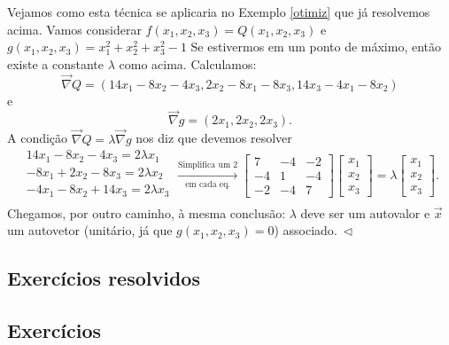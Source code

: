 \begin{obs}[Opcional]
	Vejamos como esta técnica se aplicaria no Exemplo \ref{otimiz} que já resolvemos acima. Vamos considerar $f(x_1,x_2,x_3) = Q(x_1,x_2,x_3)$ e $g(x_1,x_2,x_3) = x_1^2 + x_2^2 + x_3^2 - 1$ Se estivermos em um ponto de máximo, então existe a constante $\lambda$ como acima. Calculamos:
	\begin{equation}
	\vec{\nabla} Q = \left( 14x_1 - 8x_2 - 4 x_3, 2x_2 - 8 x_1 - 8 x_3, 14x_3 - 4 x_1 - 8 x_2 \right)
	\end{equation} e
	\begin{equation}
	\vec{\nabla} g = \left( 2 x_1, 2 x_2, 2 x_3 \right) .
	\end{equation} A condição $\vec{\nabla} Q = \lambda \vec{\nabla} g$ nos diz que devemos resolver
	\begin{equation}
	\begin{array}{c}
	14 x_1 - 8x_2 - 4 x_3 = 2 \lambda x_1 \\
	-8x_1 + 2x_2  - 8 x_3 = 2 \lambda x_2 \\
	- 4x_1 - 8 x_2 +14x_3 = 2 \lambda x_3 \\
	\end{array} \xrightarrow[\text{em cada eq.}]{\text{Simplifica um $2$}}
	\begin{bmatrix}
	7 & -4 & -2 \\
	-4 & 1 & -4 \\
	-2 & -4 & 7
	\end{bmatrix}
	\begin{bmatrix}
	x_1 \\ x_2 \\ x_3
	\end{bmatrix} = \lambda
	\begin{bmatrix}
	x_1 \\ x_2 \\ x_3
	\end{bmatrix}.
	\end{equation} Chegamos, por outro caminho, à mesma conclusão: $\lambda$ deve ser um autovalor e $\vec{x}$ um autovetor (unitário, já que $g(x_1,x_2,x_3) = 0$) associado$. \ \lhd$
\end{obs}

\subsection*{Exercícios resolvidos}

\construirExeresol

\subsection*{Exercícios}

